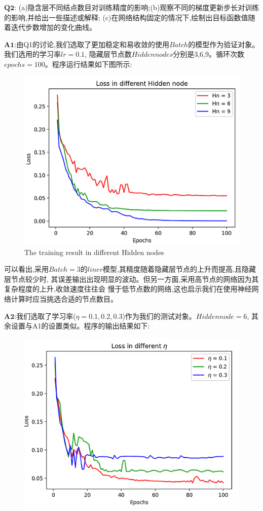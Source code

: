 \documentclass[homework]{IEEEtran}
\begin{document}
\begin{CJK}{UTF8}{gkai}
$\mathbf{Q2}$: (a)隐含层不同结点数目对训练精度的影响;(b)观察不同的梯度更新步长对训练的影响,并给出一些描述或解释;
(c)在网络结构固定的情况下,绘制出目标函数值随着迭代步数增加的变化曲线。 \par
$\mathbf{A1}$:由Q1的讨论,我们选取了更加稳定和易收敛的使用$Batch$的模型作为验证对象。我们选用的学习率$lr=0.1$,
隐藏层节点数$Hidden nodes$分别是3,6,9。循环次数$epochs=100$。程序运行结果如下图所示: \par
\begin{figure}[htb]
\centerline{\includegraphics{Images/fig4.png}}
\caption{The training result in different Hidden nodes}
\label{fig4}
\end{figure}
可以看出,采用$Batch=3$的$liner$模型,其精度随着隐藏层节点的上升而提高,且隐藏层节点较少时,
其误差输出出现明显的波动。但另一方面,采用高节点的网络因为其复杂程度的上升,收敛速度往往会
慢于低节点数的网络,这也启示我们在使用神经网络计算时应当挑选合适的节点数目。\par
$\mathbf{A2}$:我们选取了学习率($\eta = 0.1,0.2,0.3$)作为我们的测试对象。$Hidden node=6$,
其余设置与A1的设置类似。程序的输出结果如下: \par
\begin{figure}[htb]
\centerline{\includegraphics{Images/fig5.png}}

\end{figure}
\end{CJK}
\end{document}
